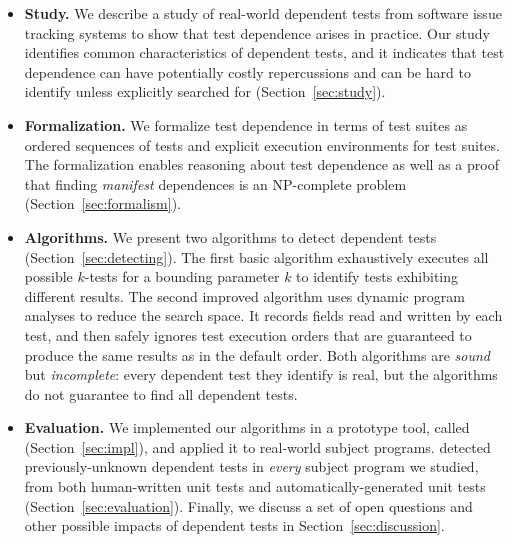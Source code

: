 \begin{itemize}

  \item \textbf{Study.} We describe a study of \dtnum real-world
  dependent tests from \repnum software issue tracking
  systems to show that test dependence
  arises in practice. Our study identifies common
  characteristics of dependent tests, and
  it indicates that test dependence can have
  potentially costly repercussions and can be hard to identify unless
  explicitly searched for (Section~\ref{sec:study}).

\item \textbf{Formalization.} We formalize test dependence
  in terms of test suites as ordered sequences of tests and explicit execution
  environments for test suites.  The formalization enables reasoning about test dependence
  as well as a proof that finding \emph{manifest} dependences is an NP-complete
  problem (Section~\ref{sec:formalism}).

  \item \textbf{Algorithms.} We present two algorithms
  to detect dependent tests (Section~\ref{sec:detecting}). The first 
  basic algorithm exhaustively executes all possible $k$-tests for
  a bounding parameter $k$ to identify tests exhibiting different results.
  The second improved algorithm uses dynamic program analyses
  to reduce the search space. It records fields read and
  written by each test, and then safely ignores test execution orders
  that are guaranteed to produce the same results as in the default
  order. Both algorithms are \emph{sound} but \emph{incomplete}:
  every dependent test they identify is real, but the algorithms
  do not guarantee to find all dependent tests. 

  \item \textbf{Evaluation.} We implemented our algorithms in a prototype
  tool, called \ourtool (Section~\ref{sec:impl}), and applied it to \subjnum real-world subject programs.
  \ourtool detected previously-unknown dependent tests in \textit{every}
  subject program we studied, from both human-written unit tests and automatically-generated
  unit tests (Section~\ref{sec:evaluation}).
  Finally, we discuss a set of open questions and other possible impacts of dependent
  tests in Section~\ref{sec:discussion}.
\end{itemize}


